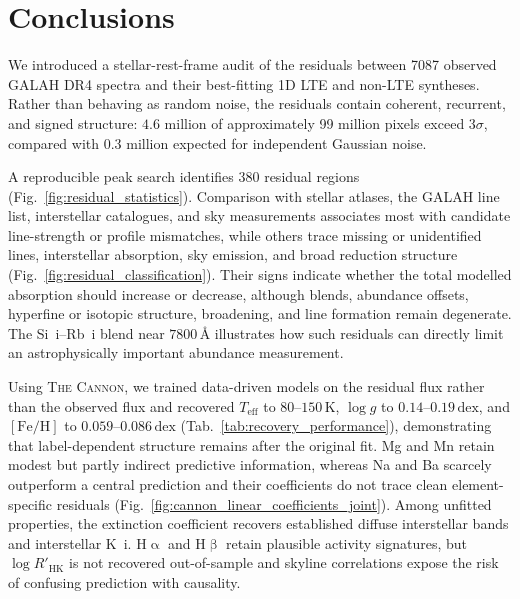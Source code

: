 \documentclass[twocolumn,apj,numberedappendix,appendixfloats]{openjournal}
\begin{document}
\section{Conclusions}
\label{sec:conclusions}

We introduced a stellar-rest-frame audit of the residuals between 7087 observed GALAH DR4 spectra and their best-fitting 1D LTE and non-LTE syntheses. Rather than behaving as random noise, the residuals contain coherent, recurrent, and signed structure: $4.6$ million of approximately 99 million pixels exceed $3\sigma$, compared with $0.3$ million expected for independent Gaussian noise.

A reproducible peak search identifies 380 residual regions (Fig.~\ref{fig:residual_statistics}). Comparison with stellar atlases, the GALAH line list, interstellar catalogues, and sky measurements associates most with candidate line-strength or profile mismatches, while others trace missing or unidentified lines, interstellar absorption, sky emission, and broad reduction structure (Fig.~\ref{fig:residual_classification}). Their signs indicate whether the total modelled absorption should increase or decrease, although blends, abundance offsets, hyperfine or isotopic structure, broadening, and line formation remain degenerate. The Si~{\sc i}--Rb~{\sc i} blend near $7800\,\text{\AA}$ illustrates how such residuals can directly limit an astrophysically important abundance measurement.

Using \textsc{The Cannon}, we trained data-driven models on the residual flux rather than the observed flux and recovered $T_\mathrm{eff}$ to $80$--$150\,\mathrm{K}$, $\log g$ to $0.14$--$0.19\,\mathrm{dex}$, and $[\mathrm{Fe/H}]$ to $0.059$--$0.086\,\mathrm{dex}$ (Tab.~\ref{tab:recovery_performance}), demonstrating that label-dependent structure remains after the original fit. Mg and Mn retain modest but partly indirect predictive information, whereas Na and Ba scarcely outperform a central prediction and their coefficients do not trace clean element-specific residuals (Fig.~\ref{fig:cannon_linear_coefficients_joint}). Among unfitted properties, the extinction coefficient recovers established diffuse interstellar bands and interstellar K~{\sc i}. $\mathrm{H}\upalpha$ and $\mathrm{H}\upbeta$ retain plausible activity signatures, but $\log R'_\mathrm{HK}$ is not recovered out-of-sample and skyline correlations expose the risk of confusing prediction with causality.
\end{document}
